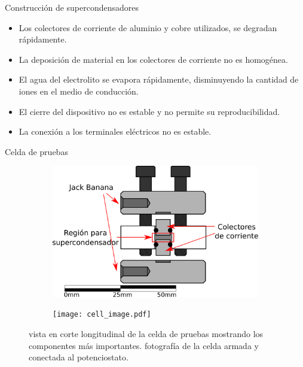 \documentclass[aspectratio=169]{beamer}
\begin{document}
	\begin{frame}{Construcción de supercondensadores}
		\begin{itemize}
			\item<1,6> Los colectores de corriente de aluminio y cobre utilizados, se degradan rápidamente.
			\item<2,6> La deposición de material en los colectores de corriente no es homogénea.
			\item<3,6> El agua del electrolito se evapora rápidamente, disminuyendo la cantidad de iones en el medio de conducción. 
			\item<4,6> El cierre del dispositivo no es estable y no permite su reproducibilidad.
			\item<5,6> La conexión a los terminales eléctricos no es estable.
		\end{itemize}
	\end{frame}

	\begin{frame}{Celda de pruebas}
		\begin{figure}[h!]
			\centering
			{
				\begin{subfigure}[b]{0.6\textwidth}
					\includegraphics[width=\textwidth]{cell_scheme.pdf}
					\caption{}
					\label{fig:cell_scheme}
				\end{subfigure}\hfill
				\begin{subfigure}[b]{0.25\textwidth}
					\texttt{[image: cell\_image.pdf]}
					\caption{}
					\label{fig:cell_image}
				\end{subfigure}
			}
			\caption[Celda de pruebas de supercondensador]{ vista en corte longitudinal de la celda de pruebas mostrando los componentes más importantes.  fotografía de la celda armada y conectada al potenciostato.}
			\label{fig:celda_de_pruebas_SC}
		\end{figure}
	\end{frame}
	
\end{document}

